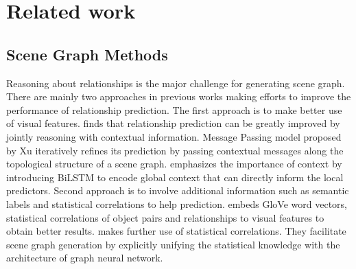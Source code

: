 \documentclass[sigconf]{acmart}
\begin{document}
\section{Related work}
\subsection{Scene Graph Methods}
Reasoning about relationships is the major challenge for generating scene graph. There are mainly two approaches in previous works making efforts to improve the performance of relationship prediction. The first approach is to make better use of visual features. \citet{xu17} finds that relationship prediction can be greatly improved by jointly reasoning with contextual information. Message Passing model proposed by Xu iteratively refines its prediction by passing contextual messages along the topological structure of a scene graph. \citet{zellers18} emphasizes the importance of context by introducing BiLSTM to encode global context that can directly inform the local predictors. Second approach is to involve additional information such as semantic labels and statistical correlations to help prediction. \citet{zellers18} embeds GloVe word vectors, statistical correlations of object pairs and relationships to visual features to obtain better results. \citet{chen19} makes further use of statistical correlations. They facilitate scene graph generation by explicitly unifying the statistical knowledge with the architecture of graph neural network.
\end{document}

